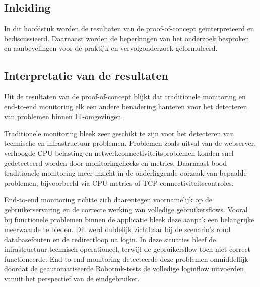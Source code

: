 
\chapter{}%
\label{ch:discussie}

\section{Inleiding}

In dit hoofdstuk worden de resultaten van de proof-of-concept geïnterpreteerd en bediscussieerd. Daarnaast worden de beperkingen van het onderzoek besproken en aanbevelingen voor de praktijk en vervolgonderzoek geformuleerd.

\section{Interpretatie van de resultaten}

Uit de resultaten van de proof-of-concept blijkt dat traditionele monitoring en end-to-end monitoring elk een andere benadering hanteren voor het detecteren van problemen binnen IT-omgevingen.

Traditionele monitoring bleek zeer geschikt te zijn voor het detecteren van technische en infrastructuur problemen. Problemen zoals uitval van de webserver, verhoogde CPU-belasting en netwerkconnectiviteitsproblemen konden snel gedetecteerd worden door monitoringchecks en metrics. Daarnaast bood traditionele monitoring meer inzicht in de onderliggende oorzaak van bepaalde problemen, bijvoorbeeld via CPU-metrics of TCP-connectiviteitscontroles.

End-to-end monitoring richtte zich daarentegen voornamelijk op de gebruikerservaring en de correcte werking van volledige gebruikersflows. Vooral bij functionele problemen binnen de applicatie bleek deze aanpak een belangrijke meerwaarde te bieden. Dit werd duidelijk zichtbaar bij de scenario’s rond databasefouten en de redirectloop na login. In deze situaties bleef de infrastructuur technisch operationeel, terwijl de gebruikersflow toch niet correct functioneerde. End-to-end monitoring detecteerde deze problemen onmiddellijk doordat de geautomatiseerde Robotmk-tests de volledige loginflow uitvoerden vanuit het perspectief van de eindgebruiker.

